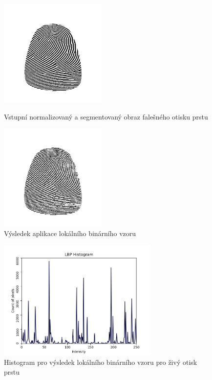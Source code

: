 \begin{figure}[htbp]
  \begin{minipage}[b]{0.5\linewidth}
    \centering
    \includegraphics[width=200px]{obrazky-figures/SG_LLnorm.png}
    \caption{Vstupní normalizovaný a segmentovaný obraz falešného otisku prstu}
  \end{minipage}
  \hspace{0.5cm}
  \begin{minipage}[b]{0.5\linewidth}
    \centering
    \includegraphics[width=200px]{obrazky-figures/SDLBP.png}
    \caption{Výsledek aplikace lokálního binárního vzoru}
  \end{minipage}
\end{figure}


\begin{figure}[htbp]
    \centering
    \includegraphics[width=300px]{obrazky-figures/histogramlive.png}
    \caption{Histogram pro výsledek lokálního binárního vzoru pro živý otisk prstu}
\end{figure}






